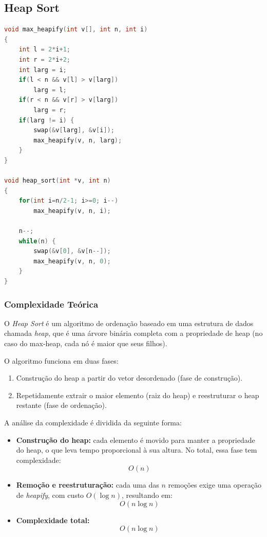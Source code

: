 \subsection{Heap Sort}
\begin{lstlisting}[language=C, caption={Implementação do Heap Sort}, label={lst:heap}]
void max_heapify(int v[], int n, int i)
{
    int l = 2*i+1;
    int r = 2*i+2;
    int larg = i;
    if(l < n && v[l] > v[larg])
        larg = l;
    if(r < n && v[r] > v[larg])
        larg = r;
    if(larg != i) {
        swap(&v[larg], &v[i]);
        max_heapify(v, n, larg);
    }
}

void heap_sort(int *v, int n)
{
    for(int i=n/2-1; i>=0; i--)
        max_heapify(v, n, i);

    n--;
    while(n) {
        swap(&v[0], &v[n--]);
        max_heapify(v, n, 0);
    }
}
\end{lstlisting}

\subsubsection{Complexidade Teórica}

O \textit{Heap Sort} é um algoritmo de ordenação baseado em uma estrutura de dados chamada \textit{heap}, que é uma árvore binária completa com a propriedade de heap (no caso do max-heap, cada nó é maior que seus filhos).

O algoritmo funciona em duas fases:

\begin{enumerate}
    \item Construção do heap a partir do vetor desordenado (fase de construção).
    \item Repetidamente extrair o maior elemento (raiz do heap) e reestruturar o heap restante (fase de ordenação).
\end{enumerate}

A análise da complexidade é dividida da seguinte forma:

\begin{itemize}
    \item \textbf{Construção do heap:} cada elemento é movido para manter a propriedade do heap, o que leva tempo proporcional à sua altura. No total, essa fase tem complexidade:
    \[
    O(n)
    \]

    \item \textbf{Remoção e reestruturação:} cada uma das \(n\) remoções exige uma operação de \textit{heapify}, com custo \(O(\log n)\), resultando em:
    \[
    O(n \log n)
    \]

    \item \textbf{Complexidade total:}
    \[
    O(n \log n)
    \]
\end{itemize}

